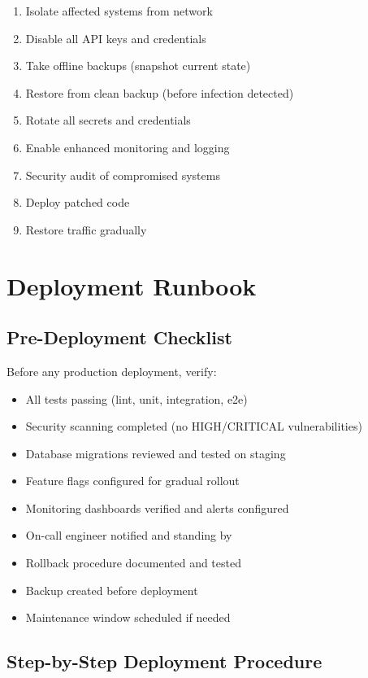 \documentclass{report}
\begin{document}
\begin{enumerate}
  \item Isolate affected systems from network
  \item Disable all API keys and credentials
  \item Take offline backups (snapshot current state)
  \item Restore from clean backup (before infection detected)
  \item Rotate all secrets and credentials
  \item Enable enhanced monitoring and logging
  \item Security audit of compromised systems
  \item Deploy patched code
  \item Restore traffic gradually
\end{enumerate}

\chapter{Deployment Runbook}

\section{Pre-Deployment Checklist}

Before any production deployment, verify:

\begin{itemize}
  \item All tests passing (lint, unit, integration, e2e)
  \item Security scanning completed (no HIGH/CRITICAL vulnerabilities)
  \item Database migrations reviewed and tested on staging
  \item Feature flags configured for gradual rollout
  \item Monitoring dashboards verified and alerts configured
  \item On-call engineer notified and standing by
  \item Rollback procedure documented and tested
  \item Backup created before deployment
  \item Maintenance window scheduled if needed
\end{itemize}

\section{Step-by-Step Deployment Procedure}
\end{document}
